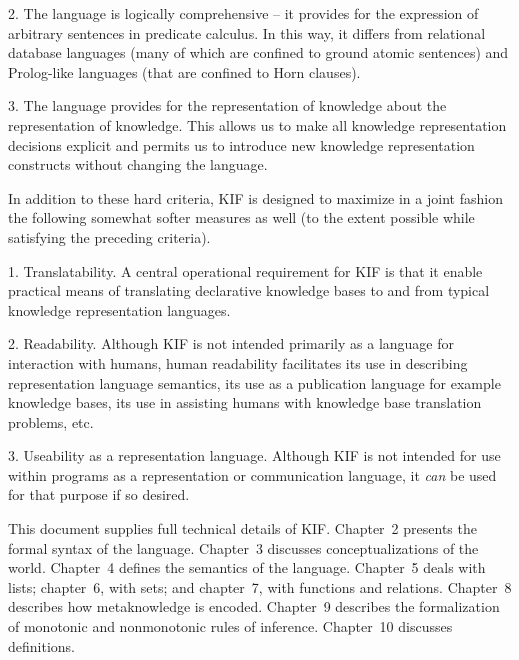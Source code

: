 \item{2.} The language is logically comprehensive -- it provides for the
expression of arbitrary sentences in predicate calculus. In this way,
it differs from relational database languages (many of which are confined to
ground atomic sentences) and Prolog-like languages (that are confined to Horn
clauses).

\item{3.} The language provides for the representation of knowledge about the
representation of knowledge.  This allows us to make all knowledge
representation decisions explicit and permits us to introduce new knowledge
representation constructs without changing the language.

\medskip

In addition to these hard criteria, KIF is designed to maximize in a joint fashion
the following somewhat softer measures as well (to the extent possible while
satisfying the preceding criteria).

\medskip

\item{1.} Translatability.  A central operational requirement for KIF is
that it enable practical means of translating declarative knowledge
bases to and from typical knowledge representation languages.

\item{2.} Readability.  Although KIF is not intended primarily as a
language for interaction with humans, human readability facilitates
its use in describing representation language semantics, its use as a
publication language for example knowledge bases, its use in assisting humans
with knowledge base translation problems, etc.

\item{3.} Useability as a representation language.  Although KIF is not
intended for use within programs as a representation or communication
language, it {\it can} be used for that purpose if so desired.

\medskip

This document supplies full technical details of KIF.  Chapter~2 presents the
formal syntax of the language.  Chapter~3 discusses conceptualizations of the
world.  Chapter~4 defines the semantics of the language.  Chapter~5 deals with
lists; chapter~6, with sets; and chapter~7, with functions and relations. 
Chapter~8 describes how metaknowledge is encoded.  Chapter~9 describes the
formalization of monotonic and nonmonotonic rules of inference.  Chapter~10
discusses definitions.


